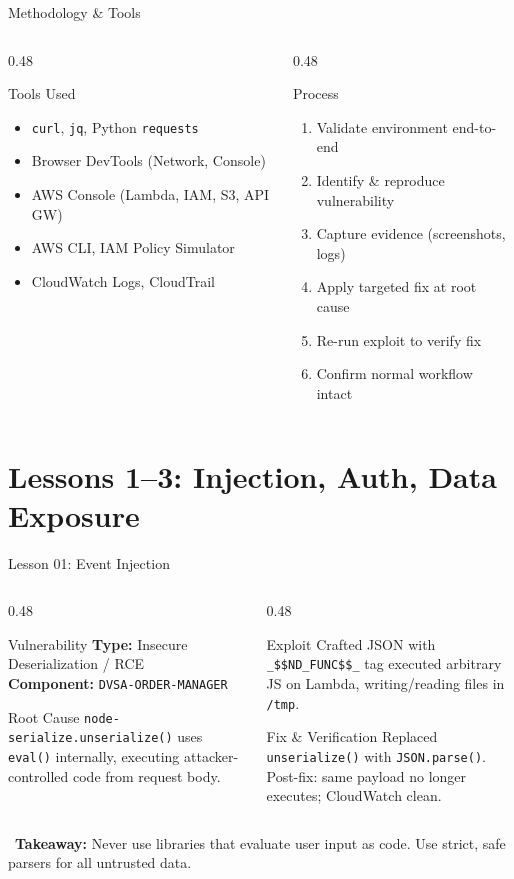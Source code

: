 \documentclass[aspectratio=169,10pt]{beamer}
\newcommand{\lessonslide}[8]{
\begin{frame}{Lesson #1: #2}
\begin{columns}[T]
\begin{column}{0.48\textwidth}
  \begin{alertblock}{\ding{72} Vulnerability}
    \textbf{Type:} #3\\
    \textbf{Component:} \texttt{#4}
  \end{alertblock}
  \begin{block}{\ding{46} Root Cause}
    #5
  \end{block}
\end{column}
\begin{column}{0.48\textwidth}
  \begin{alertblock}{\ding{55} Exploit}
    #6
  \end{alertblock}
  \begin{exampleblock}{\ding{51} Fix \& Verification}
    #7
  \end{exampleblock}
\end{column}
\end{columns}
\vspace{0.3em}
\centering\small\textcolor{kfupm}{\ding{228}~\textbf{Takeaway:} #8}
\end{frame}
}
\begin{document}
\begin{frame}{Methodology \& Tools}
\begin{columns}[T]
\begin{column}{0.48\textwidth}
  \begin{block}{ Tools Used}
    \begin{itemize}
      \item \texttt{curl}, \texttt{jq}, Python \texttt{requests}
      \item Browser DevTools (Network, Console)
      \item AWS Console (Lambda, IAM, S3, API GW)
      \item AWS CLI, IAM Policy Simulator
      \item CloudWatch Logs, CloudTrail
    \end{itemize}
  \end{block}
\end{column}
\begin{column}{0.48\textwidth}
  \begin{block}{ Process}
    \begin{enumerate}
      \item Validate environment end-to-end
      \item Identify \& reproduce vulnerability
      \item Capture evidence (screenshots, logs)
      \item Apply targeted fix at root cause
      \item Re-run exploit to verify fix
      \item Confirm normal workflow intact
    \end{enumerate}
  \end{block}
\end{column}
\end{columns}
\end{frame}

\section{Lessons 1--3: Injection, Auth, Data Exposure}

\lessonslide{01}{Event Injection}
{Insecure Deserialization / RCE}
{DVSA-ORDER-MANAGER}
{\texttt{node-serialize.unserialize()} uses \texttt{eval()} internally, executing attacker-controlled code from request body.}
{Crafted JSON with \texttt{\_\$\$ND\_FUNC\$\$\_} tag executed arbitrary JS on Lambda, writing/reading files in \texttt{/tmp}.}
{Replaced \texttt{unserialize()} with \texttt{JSON.parse()}. Post-fix: same payload no longer executes; CloudWatch clean.}
{Never use libraries that evaluate user input as code. Use strict, safe parsers for all untrusted data.}
\end{document}
